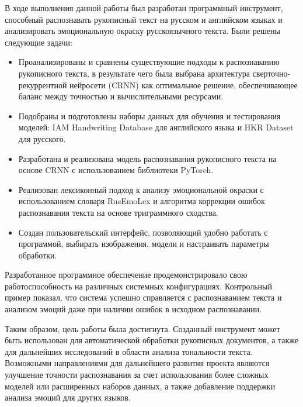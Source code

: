 \documentclass[12pt,a4paper]{article}
\begin{document}
В ходе выполнения данной работы был разработан программный инструмент, способный
распознавать рукописный текст на русском и английском языках и анализировать
эмоциональную окраску русскоязычного текста. Были решены следующие задачи:
\begin{itemize}
    \item Проанализированы и сравнены существующие подходы к распознаванию рукописного текста, в результате чего была выбрана архитектура сверточно-рекуррентной нейросети (CRNN) как оптимальное решение, обеспечивающее баланс между точностью и вычислительными ресурсами.
    \item Подобраны и подготовлены наборы данных для обучения и тестирования моделей: IAM Handwriting Database для английского языка и HKR Dataset для русского.
    \item Разработана и реализована модель распознавания рукописного текста на основе CRNN с использованием библиотеки PyTorch.
    \item Реализован лексиконный подход к анализу эмоциональной окраски с использованием словаря RusEmoLex и алгоритма коррекции ошибок распознавания текста на основе триграммного сходства.
    \item Создан пользовательский интерфейс, позволяющий удобно работать с программой, выбирать изображения, модели и настраивать параметры обработки.
\end{itemize}

Разработанное программное обеспечение продемонстрировало свою работоспособность на различных системных конфигурациях. Контрольный пример показал, что система успешно справляется с распознаванием текста и анализом эмоций даже при наличии ошибок в исходном распознавании.

Таким образом, цель работы была достигнута. Созданный инструмент может быть использован для автоматической обработки рукописных документов, а также для дальнейших исследований в области анализа тональности текста. Возможными направлениями для дальнейшего развития проекта являются улучшение точности распознавания за счет использования более сложных моделей или расширенных наборов данных, а также добавление поддержки анализа эмоций для других языков.
\end{document}

